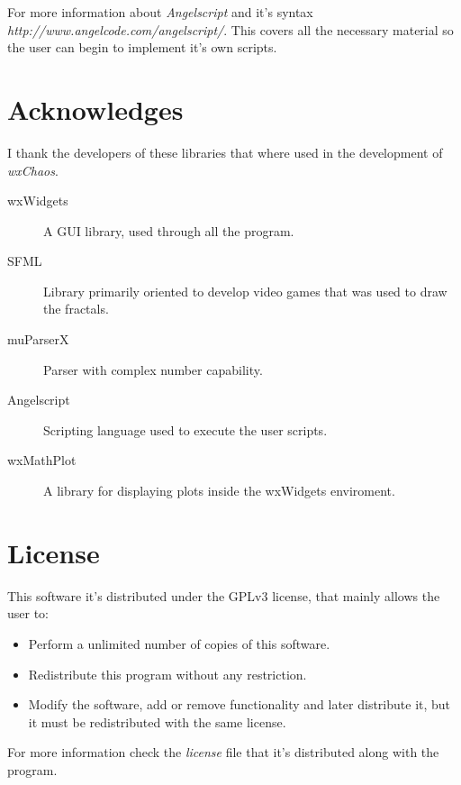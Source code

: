 \documentclass[oneside]{book}
\begin{document}
For more information about \textit{Angelscript} and it's syntax \textit{http://www.angelcode.com/angelscript/}.
This covers all the necessary material so the user can begin to implement it's own scripts.

\chapter{Acknowledges}
I thank the developers of these libraries that where used in the development of \textit{wxChaos}.

\begin{description}
\item[wxWidgets] A GUI library, used through all the program.
\item[SFML] Library primarily oriented to develop video games that was used to draw the fractals.
\item[muParserX] Parser with complex number capability.
\item[Angelscript] Scripting language used to execute the user scripts.
\item[wxMathPlot] A library for displaying plots inside the wxWidgets enviroment.
\end{description}

\chapter{License}
This software it's distributed under the GPLv3 license, that mainly allows the user to:

\begin{itemize}
\item Perform a unlimited number of copies of this software.
\item Redistribute this program without any restriction.
\item Modify the software, add or remove functionality and later distribute it, but it must be redistributed with the same license.
\end{itemize}

For more information check the \textit{license} file that it's distributed along with the program.
\end{document}
